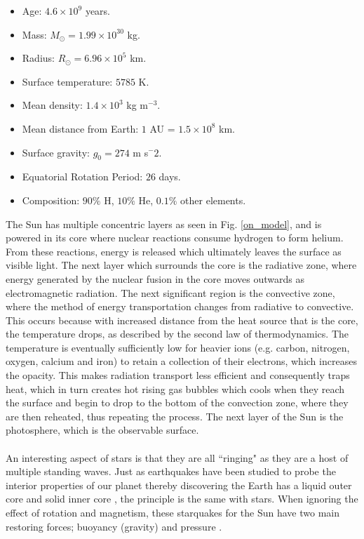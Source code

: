 \documentclass[12pt]{ociamthesis}
\newcommand{\np}{\\ \\}
\begin{document}
\begin{itemize}
    \item Age: $4.6 \times 10^9$ years.
    \item Mass: $M_{\odot}= 1.99 \times 10^{30}$ kg.
    \item Radius: $R_{\odot} = 6.96 \times 10^5$ km.
    \item Surface temperature: $5785$ K.
    \item Mean density: $1.4 \times 10^3$ kg m$^{-3}$.
    \item Mean distance from Earth: $1$ AU = $1.5 \times 10^8$ km.
    \item Surface gravity: $g_{0}=274$ m s$^-2$.
    \item Equatorial Rotation Period: $26$ days.
    \item Composition: $90 \%$ H, $10 \%$ He, $0.1 \%$ other elements.
\end{itemize}
%
The Sun has multiple concentric layers as seen in Fig. \ref{on_model}, and is powered in its core where nuclear reactions consume hydrogen to form helium. From these reactions, energy is released which ultimately leaves the surface as visible light. The next layer which surrounds the core is the radiative zone, where energy generated by the nuclear fusion in the core moves outwards as electromagnetic radiation. The next significant region is the convective zone, where the method of energy transportation changes from radiative to convective. This occurs because with increased distance from the heat source that is the core, the temperature drops, as described by the second law of thermodynamics. The temperature is eventually sufficiently low for heavier ions (e.g. carbon, nitrogen, oxygen, calcium and iron) to retain a collection of their electrons, which increases the opacity. This makes radiation transport less efficient and consequently traps heat, which in turn creates hot rising gas bubbles which cools when they reach the surface and begin to drop to the bottom of the convection zone, where they are then reheated, thus repeating the process. The next layer of the Sun is the photosphere, which is the observable surface. \np
%
An interesting aspect of stars is that they are all ``ringing" as they are a host of multiple standing waves. Just as earthquakes have been studied to probe the interior properties of our planet thereby discovering the Earth has a liquid outer core and solid inner core \citep{Lehmann1936}, the principle is the same with stars. When ignoring the effect of rotation and magnetism, these starquakes for the Sun have two main restoring forces; buoyancy (gravity) and pressure \citep{Appourchaux2010AARv18197A}. \np
\end{document}

